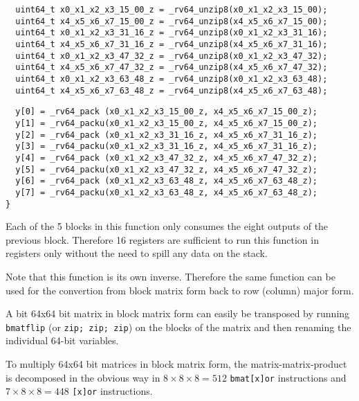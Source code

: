 \begin{minipage}{\linewidth}
\begin{verbatim}
  uint64_t x0_x1_x2_x3_15_00_z = _rv64_unzip8(x0_x1_x2_x3_15_00);
  uint64_t x4_x5_x6_x7_15_00_z = _rv64_unzip8(x4_x5_x6_x7_15_00);
  uint64_t x0_x1_x2_x3_31_16_z = _rv64_unzip8(x0_x1_x2_x3_31_16);
  uint64_t x4_x5_x6_x7_31_16_z = _rv64_unzip8(x4_x5_x6_x7_31_16);
  uint64_t x0_x1_x2_x3_47_32_z = _rv64_unzip8(x0_x1_x2_x3_47_32);
  uint64_t x4_x5_x6_x7_47_32_z = _rv64_unzip8(x4_x5_x6_x7_47_32);
  uint64_t x0_x1_x2_x3_63_48_z = _rv64_unzip8(x0_x1_x2_x3_63_48);
  uint64_t x4_x5_x6_x7_63_48_z = _rv64_unzip8(x4_x5_x6_x7_63_48);
\end{verbatim}
\end{minipage}

\begin{minipage}{\linewidth}
\begin{verbatim}
  y[0] = _rv64_pack (x0_x1_x2_x3_15_00_z, x4_x5_x6_x7_15_00_z);
  y[1] = _rv64_packu(x0_x1_x2_x3_15_00_z, x4_x5_x6_x7_15_00_z);
  y[2] = _rv64_pack (x0_x1_x2_x3_31_16_z, x4_x5_x6_x7_31_16_z);
  y[3] = _rv64_packu(x0_x1_x2_x3_31_16_z, x4_x5_x6_x7_31_16_z);
  y[4] = _rv64_pack (x0_x1_x2_x3_47_32_z, x4_x5_x6_x7_47_32_z);
  y[5] = _rv64_packu(x0_x1_x2_x3_47_32_z, x4_x5_x6_x7_47_32_z);
  y[6] = _rv64_pack (x0_x1_x2_x3_63_48_z, x4_x5_x6_x7_63_48_z);
  y[7] = _rv64_packu(x0_x1_x2_x3_63_48_z, x4_x5_x6_x7_63_48_z);
}
\end{verbatim}
\end{minipage}

Each of the 5 blocks in this function only consumes the eight outputs of the
previous block. Therefore 16 registers are sufficient to run this function in
registers only without the need to spill any data on the stack.

Note that this function is its own inverse. Therefore the same function
can be used for the convertion from block matrix form back to row (column)
major form.

A bit 64x64 bit matrix in block matrix form can easily be transposed
by running {\tt bmatflip} (or {\tt zip; zip; zip}) on the blocks of
the matrix and then renaming the individual 64-bit variables.

To multiply 64x64 bit matrices in block matrix form, the matrix-matrix-product
is decomposed in the obvious way in $8 \times 8 \times 8 = 512$ {\tt bmat[x]or}
instructions and $7 \times 8 \times 8 = 448$ {\tt [x]or} instructions.


